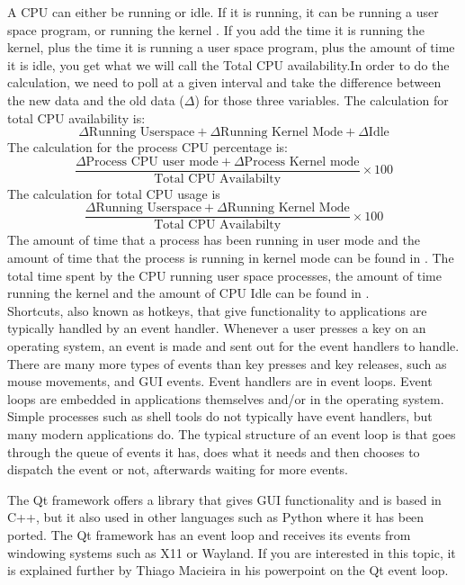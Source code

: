 \documentclass[12pt]{article}
\begin{document}
A CPU can either be running or idle.
If it is running, it can be running a user space program, or running the kernel \cite{scoutBlog}.
If you add the time it is running the kernel, plus the time it is running a user space program, plus the amount of time it is idle, you get what we will call the Total CPU availability.In order to do the calculation, we need to poll at a given interval and take the difference between the new data and the old data ($\Delta$) for those three variables. The calculation for total CPU availability is:\\
$$ \Delta\text{Running Userspace} + \Delta\text{Running Kernel Mode} + \Delta\text{Idle}$$
The calculation for the process CPU percentage is:\\
$$ \frac{\Delta\text{Process CPU user mode} + \Delta\text{Process Kernel mode}}{\text{Total CPU Availabilty}} \times 100 $$
The calculation for total CPU usage is\\
$$ \frac{\Delta\text{Running Userspace} + \Delta\text{Running Kernel Mode}}{\text{Total CPU Availabilty}} \times 100 $$
The amount of time that a process has been running in user mode and the amount of time that the process is running in kernel mode can be found in . \cite{manProc}
The total time spent by the CPU running user space processes, the amount of time running the kernel and the amount of CPU Idle can be found in  \cite{manProc}.\\
	
	
Shortcuts, also known as hotkeys, that give functionality to applications are typically handled by an event handler.
Whenever a user presses a key on an operating system, an event is made and sent out for the event handlers to handle.
There are many more types of events than key presses and key releases, such as mouse movements, and GUI events.
Event handlers are in event loops. Event loops are embedded in applications themselves and/or in the operating system. Simple processes such as shell tools do not typically have event handlers, but many modern applications do. The typical structure of an event loop is that goes through the queue of events it has, does what it needs and then chooses to dispatch the event or not, afterwards waiting for more events. 

The Qt framework offers a library that gives GUI functionality and is based in C++, but it also used in other languages such as Python where it has been ported.
The Qt framework has an event loop and receives its events from windowing systems such as X11 or Wayland.
If you are interested in this topic, it is explained further by Thiago Macieira in his powerpoint on the Qt event loop\cite{QtSlides}.
\end{document}
